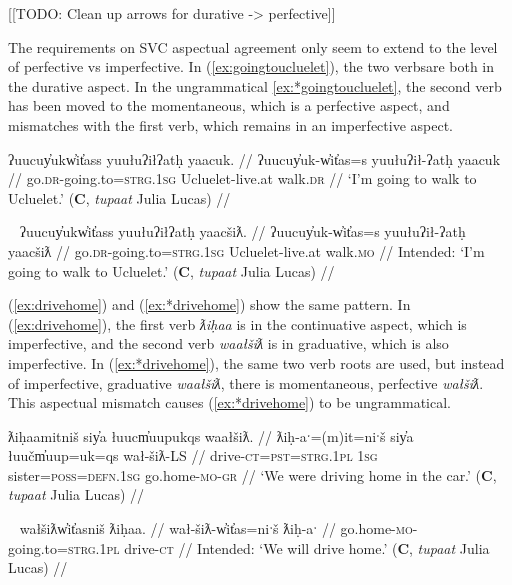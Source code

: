 [[TODO: Clean up arrows for durative -> perfective]]


\vspace{10pt}

The requirements on SVC aspectual agreement only seem to extend to the level of perfective vs imperfective. In (\ref{ex:goingtoucluelet}), the two verbsare both in the durative aspect. In the ungrammatical \ref{ex:*goingtoucluelet}, the second verb has been moved to the momentaneous, which is a perfective aspect, and mismatches with the first verb, which remains in an imperfective aspect.

\ex \label{ex:goingtoucluelet}
\begingl
\glpreamble ʔuucuy̓ukw̓it̓ass yuułuʔiłʔatḥ yaacuk. //
\gla ʔuucuy̓uk-w̓it̓as=s yuułuʔił-ʔatḥ yaacuk //
\glb go.\textsc{dr}-going.to=\textsc{strg.1sg} Ucluelet-live.at walk.\textsc{dr} //
\glft `I'm going to walk to Ucluelet.' (\textbf{C}, \textit{tupaat} Julia Lucas) //
\endgl
\xe

\ex~ \label{ex:*goingtoucluelet}
\begingl
\glpreamble *ʔuucuy̓ukw̓it̓ass yuułuʔiłʔatḥ yaacšiƛ. //
\gla ʔuucuy̓uk-w̓it̓as=s yuułuʔił-ʔatḥ yaacšiƛ //
\glb go.\textsc{dr}-going.to=\textsc{strg.1sg} Ucluelet-live.at walk.\textsc{mo} //
\glft Intended: `I'm going to walk to Ucluelet.' (\textbf{C}, \textit{tupaat} Julia Lucas) //
\endgl
\xe

(\ref{ex:drivehome}) and (\ref{ex:*drivehome}) show the same pattern. In (\ref{ex:drivehome}), the first verb \textit{ƛiḥaa} is in the continuative aspect, which is imperfective, and the second verb \textit{waałšiƛ} is in graduative, which is also imperfective. In (\ref{ex:*drivehome}), the same two verb roots are used, but instead of imperfective, graduative \textit{waałšiƛ}, there is momentaneous, perfective \textit{wałšiƛ}. This aspectual mismatch causes (\ref{ex:*drivehome}) to be ungrammatical.

\ex \label{ex:drivehome}
\begingl
\glpreamble ƛiḥaamitniš siy̓a łuucm̓uupukqs waałšiƛ. //
\gla ƛiḥ-aˑ=(m)it=niˑš siy̓a łuučm̓uup=uk=qs wał-šiƛ-LS //
\glb drive-\textsc{ct}=\textsc{pst}=\textsc{strg.1pl} \textsc{1sg} sister=\textsc{poss}=\textsc{defn.1sg} go.home-\textsc{mo}-\textsc{gr} //
\glft `We were driving home in the car.' (\textbf{C}, \textit{tupaat} Julia Lucas) //
\endgl
\xe

\ex~ \label{ex:*drivehome}
\begingl
\glpreamble *wałšiƛw̓it̓asniš ƛiḥaa. //
\gla wał-šiƛ-w̓it̓as=niˑš ƛiḥ-aˑ //
\glb go.home-\textsc{mo}-going.to=\textsc{strg.1pl} drive-\textsc{ct} //
\glft Intended: `We will drive home.' (\textbf{C}, \textit{tupaat} Julia Lucas) //
\endgl
\xe

